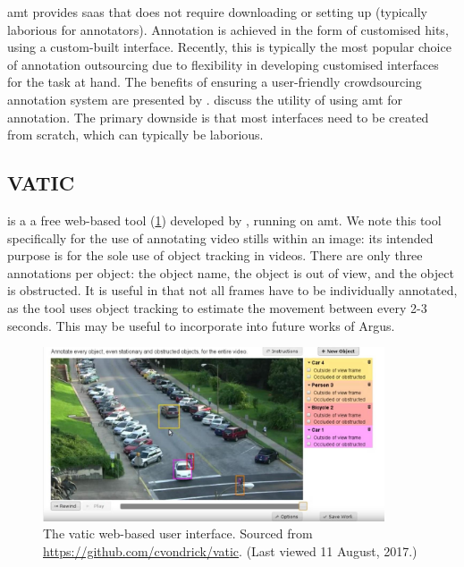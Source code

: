 \gls{amt} provides \gls{saas} that does not require downloading or setting up (typically laborious for annotators). Annotation is achieved in the form of customised \glspl{hit}, using a custom-built interface. Recently, this is typically the most popular choice of annotation outsourcing \citep{Lin:2014vma,Veit:2016vj,Chen:2015ur,JiaDeng:2009dl,Netzer:2011to} due to flexibility in developing customised interfaces for the task at hand. The benefits of ensuring a user-friendly crowdsourcing annotation system are presented by \citet{Matera:2014wq}. \citet{Sorokin:2008uk} discuss the utility of using \gls{amt} for annotation. The primary downside is that most interfaces need to be created from scratch, which can typically be laborious.

\subsection{VATIC}

 is a a free web-based tool (\cref{fig:dataset:architecture_evaluation:tools:vatic}) developed by \citet{springerlink:10.1007/s11263-012-0564-1}, running on \gls{amt}. We note this tool specifically for the use of annotating video stills within an image: its intended purpose is for the sole use of object tracking in videos. There are only three annotations per object: the object name, the object is out of view, and the object is obstructed. It is useful in that not all frames have to be individually annotated, as the tool uses object tracking to estimate the movement between every 2-3 seconds. This may be useful to incorporate into future works of Argus. 

\begin{figure}[h]
  \centering
  \includegraphics[width=0.9\textwidth]{images/dataset/tools/vatic}
  \caption[The VATIC web-based user interface]{The \gls{vatic} web-based user interface. Sourced from \url{https://github.com/cvondrick/vatic}. (Last viewed 11 August, 2017.)}
  \label{fig:dataset:architecture_evaluation:tools:vatic}
\end{figure}

